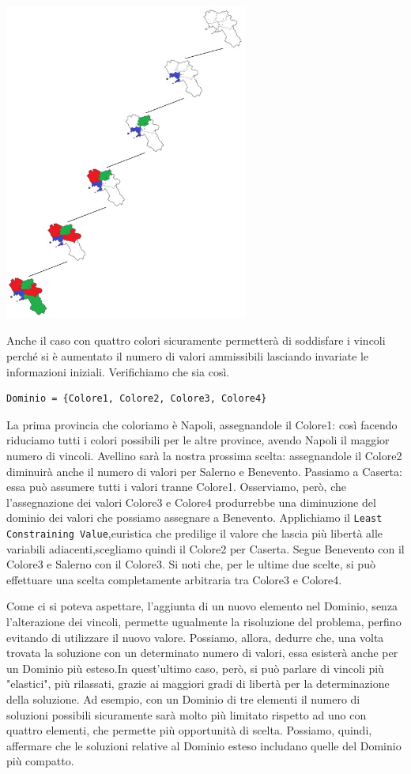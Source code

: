 		\begin{center}
			\includegraphics[width=0.6\textwidth, height=0.4\textheight]{SearchTree.jpg}
		\end{center}\par
		Anche il caso con quattro colori sicuramente permetterà di soddisfare i vincoli perché si è aumentato il numero di valori ammissibili lasciando invariate le informazioni iniziali. Verifichiamo che sia così.
		\begin{lstlisting}
Dominio = {Colore1, Colore2, Colore3, Colore4}
		\end{lstlisting}
		La prima provincia che coloriamo è Napoli, assegnandole il Colore1: così facendo riduciamo tutti i colori possibili per le altre province, avendo Napoli il maggior numero di vincoli. Avellino sarà la nostra prossima scelta: assegnandole il Colore2 diminuirà anche il numero di valori per Salerno e Benevento. Passiamo a Caserta: essa può assumere tutti i valori tranne Colore1. Osserviamo, però, che l'assegnazione dei valori Colore3 e Colore4 produrrebbe una diminuzione del dominio dei valori che possiamo assegnare a Benevento. Applichiamo il \texttt{Least Constraining Value},euristica che predilige il valore che lascia più libertà alle variabili adiacenti,scegliamo quindi il Colore2 per  Caserta. Segue Benevento con il Colore3 e Salerno con il Colore3. Si noti che, per le ultime due scelte, si può effettuare una scelta completamente arbitraria tra Colore3 e Colore4.\par
		Come ci si poteva aspettare, l'aggiunta di un nuovo elemento nel Dominio, senza l'alterazione dei vincoli, permette ugualmente la risoluzione del problema, perfino evitando di utilizzare il nuovo valore. Possiamo, allora, dedurre che, una volta trovata la soluzione con un determinato numero di valori, essa esisterà anche per un Dominio più esteso.In quest'ultimo caso, però, si può parlare di vincoli più "elastici", più rilassati, grazie ai maggiori gradi di libertà per la determinazione della soluzione. Ad esempio, con un Dominio di tre elementi il numero di soluzioni possibili sicuramente sarà molto più limitato rispetto ad uno con quattro elementi, che permette più opportunità di scelta. Possiamo, quindi, affermare che le soluzioni relative al Dominio esteso includano quelle del Dominio più compatto. 

